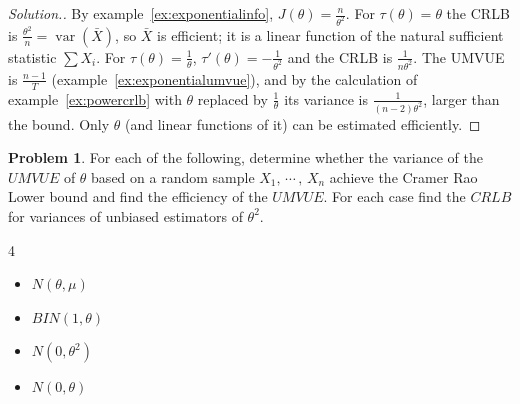\documentclass[12pt,a4paper]{report}
\theoremstyle{definition}
\DeclareMathOperator{\var}{var}
\newtheorem{problemx}{Problem}[section]
\newenvironment{problem}{\begin{problemx}}{\end{problemx}}
\newenvironment{solution}
  {\renewcommand{\qedsymbol}{}\begin{proof}[\textit{Solution}.]}
  {\end{proof}}
\begin{document}
\begin{solution}
By example~\ref{ex:exponentialinfo}, $J(\theta) = \frac{n}{\theta^2}$. For
$\tau(\theta) = \theta$ the CRLB is $\frac{\theta^2}{n} = \var(\bar X)$, so $\bar X$ is
efficient; it is a linear function of the natural sufficient statistic $\sum X_i$.
For $\tau(\theta) = \frac1\theta$, $\tau'(\theta) = -\frac{1}{\theta^2}$ and the CRLB is
$\frac{1}{n\theta^2}$. The UMVUE is $\frac{n - 1}{T}$ (example~\ref{ex:exponentialumvue}),
and by the calculation of example~\ref{ex:powercrlb} with $\theta$ replaced by
$\frac1\theta$ its variance is $\frac{1}{(n - 2)\theta^2}$, larger than the bound. Only
$\theta$ (and linear functions of it) can be estimated efficiently.
\end{solution}

\begin{problem}
For each of the following, determine whether the variance of the $UMVUE$ of $\theta$ based on a random sample $X_1, \, \cdots\, , \, X_n$ achieve the Cramer Rao Lower bound and find the efficiency of the $UMVUE$. For each case find the $CRLB$ for variances of unbiased estimators of $\theta^2$.
\begin{multicols}{4}
\begin{itemize}
\item[(a)] $N(\theta,\mu)$
\item[(b)] $BIN(1,\theta)$
\item[(c)] $N(0,\theta^2)$
\item[(d)] $N(0,\theta)$
\end{itemize}
\end{multicols}
\end{problem}
\end{document}
